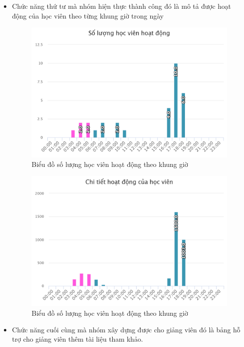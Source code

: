 \begin{itemize}
	\vskip 5cm
	\item Chức năng thứ tư mà nhóm hiện thực thành công đó là mô tả được hoạt động của học viên theo từng khung giờ trong ngày
	\begin{center}
		\begin{figure}[htp]
			\begin{center}
				\includegraphics[width=0.8\linewidth]{img/51}
			\end{center}
			\caption{Biểu đồ số lượng học viên hoạt động theo khung giờ}
			\label{refhinh89}
		\end{figure}
	\end{center}

	\begin{center}
		\begin{figure}[htp]
			\begin{center}
				\includegraphics[width=0.8\linewidth]{img/52}
			\end{center}
			\caption{Biểu đồ số lượng học viên hoạt động theo khung giờ}
			\label{refhinh90}
		\end{figure}
	\end{center}
	
	\vskip 5cm
	\item Chức năng cuối cùng mà nhóm xây dựng được cho giảng viên đó là bảng hỗ trợ cho giảng viên thêm tài liệu tham khảo.
	

\end{itemize}
